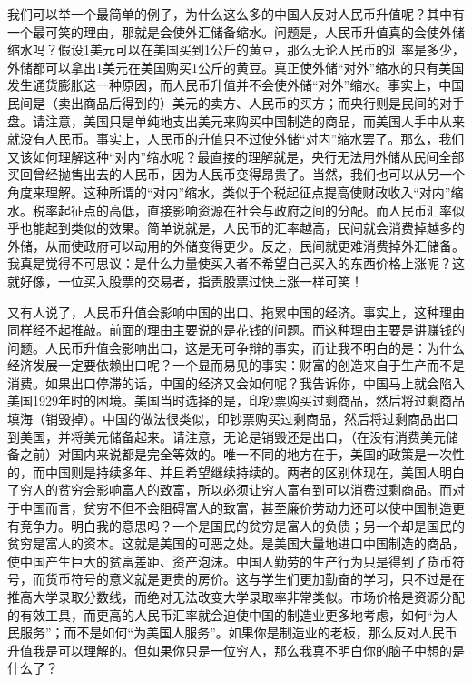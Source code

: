 我们可以举一个最简单的例子，为什么这么多的中国人反对人民币升值呢？其中有一个最可笑的理由，那就是会使外汇储备缩水。问题是，人民币升值真的会使外储缩水吗？假设1美元可以在美国买到1公斤的黄豆，那么无论人民币的汇率是多少，外储都可以拿出1美元在美国购买1公斤的黄豆。真正使外储“对外”缩水的只有美国发生通货膨胀这一种原因，而人民币升值并不会使外储“对外”缩水。事实上，中国民间是（卖出商品后得到的）美元的卖方、人民币的买方；而央行则是民间的对手盘。请注意，美国只是单纯地支出美元来购买中国制造的商品，而美国人手中从来就没有人民币。事实上，人民币的升值只不过使外储“对内”缩水罢了。那么，我们又该如何理解这种“对内”缩水呢？最直接的理解就是，央行无法用外储从民间全部买回曾经抛售出去的人民币，因为人民币变得昂贵了。当然，我们也可以从另一个角度来理解。这种所谓的“对内”缩水，类似于个税起征点提高使财政收入“对内”缩水。税率起征点的高低，直接影响资源在社会与政府之间的分配。而人民币汇率似乎也能起到类似的效果。简单说就是，人民币的汇率越高，民间就会消费掉越多的外储，从而使政府可以动用的外储变得更少。反之，民间就更难消费掉外汇储备。我真是觉得不可思议：是什么力量使买入者不希望自己买入的东西价格上涨呢？这就好像，一位买入股票的交易者，指责股票过快上涨一样可笑！

又有人说了，人民币升值会影响中国的出口、拖累中国的经济。事实上，这种理由同样经不起推敲。前面的理由主要说的是花钱的问题。而这种理由主要是讲赚钱的问题。人民币升值会影响出口，这是无可争辩的事实，而让我不明白的是：为什么经济发展一定要依赖出口呢？一个显而易见的事实：财富的创造来自于生产而不是消费。如果出口停滞的话，中国的经济又会如何呢？我告诉你，中国马上就会陷入美国1929年时的困境。美国当时选择的是，印钞票购买过剩商品，然后将过剩商品填海（销毁掉）。中国的做法很类似，印钞票购买过剩商品，然后将过剩商品出口到美国，并将美元储备起来。请注意，无论是销毁还是出口，（在没有消费美元储备之前）对国内来说都是完全等效的。唯一不同的地方在于，美国的政策是一次性的，而中国则是持续多年、并且希望继续持续的。两者的区别体现在，美国人明白了穷人的贫穷会影响富人的致富，所以必须让穷人富有到可以消费过剩商品。而对于中国而言，贫穷不但不会阻碍富人的致富，甚至廉价劳动力还可以使中国制造更有竞争力。明白我的意思吗？一个是国民的贫穷是富人的负债；另一个却是国民的贫穷是富人的资本。这就是美国的可恶之处。是美国大量地进口中国制造的商品，使中国产生巨大的贫富差距、资产泡沫。中国人勤劳的生产行为只是得到了货币符号，而货币符号的意义就是更贵的房价。这与学生们更加勤奋的学习，只不过是在推高大学录取分数线，而绝对无法改变大学录取率非常类似。市场价格是资源分配的有效工具，而更高的人民币汇率就会迫使中国的制造业更多地考虑，如何“为人民服务”；而不是如何“为美国人服务”。如果你是制造业的老板，那么反对人民币升值我是可以理解的。但如果你只是一位穷人，那么我真不明白你的脑子中想的是什么了？

